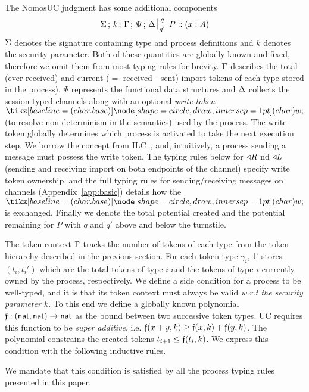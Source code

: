 The NomosUC judgment has some additional components
\[
\Sg \semi k \semi \Tokens \semi \Psi \semi \D \entailpot{q}{q'} P :: (x : A)
\]
$\Sigma$ denotes the signature containing type and process definitions and $k$
denotes the security parameter.
Both of these quantities are globally known and fixed, therefore we omit them from
most typing rules for brevity.
$\Gamma$ describes the total (ever received) and current ($=$ received - sent) import tokens
of each type stored in the process).
$\Psi$ represents the functional data structures and $\Delta$ collects the
session-typed channels along with an optional \emph{write token} $\wt$
(to resolve non-determinism in the semantics) used by the process. 
The write token globally determines which process is activated to take the next execution step.
We borrow the concept from ILC~\cite{ilc}, and, intuitively, a process sending a message must possess the write token. 
The typing rules below for $\triangleleft R$ nd $\triangleleft L$ (sending and receiving import on both endpoints of the channel) specify write token ownership, and the full typing rules for sending/receiving messages on channels (Appendix~\ref{app:basic}) details how the $\wt$ is exchanged.
Finally we denote the total potential created and the potential remaining for $P$ with $q$ and $q'$ above and below the turnstile.

The token context $\Gamma$ tracks the number of tokens of each type from the token hierarchy described in the previous section.
For each token type $\gamma_i$, $\Gamma$ stores $(t_i,t_i')$ which are the total tokens of type $i$ and the tokens of type $i$ currently owned by the process, respectively. 
We define a side condition for a process to be well-typed, and it is that its token context must always be valid \emph{w.r.t the security parameter $k$}.
To this end we define a globally known polynomial $\mathfrak{f} : ({\mathsf {nat}}, {\mathsf {nat}}) \rightarrow {\mathsf {nat}}$ as the bound between two successive token types. UC requires this function to be \emph{super additive}, i.e. $\mathfrak{f}(x+y,k) \geq \mathfrak{f}(x,k) + \mathfrak{f}(y,k)$.
The polynomial constrains the created tokens $t_{i+1} \leq \mathfrak{f}(t_i, k)$.
We express this condition with the following inductive rules.
We mandate that this condition is satisfied by all the process typing rules presented in this paper.

